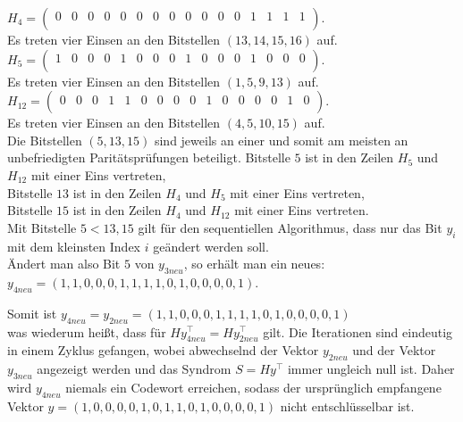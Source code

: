 \begin{Beispiel}
    $H_4= \left( \begin{array}{rrrrrrrrrrrrrrrr}
        0 & 0 & 0 & 0 & 0 & 0 & 0 & 0 & 0 & 0 & 0 & 0 & 1 & 1 & 1 & 1 \\
       \end{array}\right). 
    $\\
    Es treten vier Einsen an den Bitstellen $(13, 14, 15, 16)$ auf.\\
    
    $H_5= \left( \begin{array}{rrrrrrrrrrrrrrrr}
        1 & 0 & 0 & 0 & 1 & 0 & 0 & 0 & 1 & 0 & 0 & 0 & 1 & 0 & 0 & 0 \\
       \end{array}\right). 
    $\\
    Es treten vier Einsen an den Bitstellen $(1, 5, 9, 13)$ auf.\\
    
    $H_{12}= \left( \begin{array}{rrrrrrrrrrrrrrrr}
        0 & 0 & 0 & 1 & 1 & 0 & 0 & 0 & 0 & 1 & 0 & 0 & 0 & 0 & 1 & 0 \\
       \end{array}\right). 
    $\\
    Es treten vier Einsen an den Bitstellen $(4, 5, 10, 15)$ auf.\\
    
    Die Bitstellen $(5, 13, 15)$ sind jeweils an einer und somit am meisten an unbefriedigten Paritätsprüfungen beteiligt.
    Bitstelle $5$ ist in den Zeilen $H_5$ und $H_{12}$ mit einer Eins vertreten,\\
    Bitstelle $13$ ist in den Zeilen $H_4$ und $H_5$ mit einer Eins vertreten,\\
    Bitstelle $15$ ist in den Zeilen $H_4$ und $H_{12}$ mit einer Eins vertreten.\\
    Mit Bitstelle $5 < 13, 15$ gilt für den sequentiellen Algorithmus, dass nur das Bit $y_i$ mit dem kleinsten Index $i$ geändert werden soll.\\
    
    Ändert man also Bit $5$ von $y_{3neu}$, so erhält man ein neues:\\
    $y_{4neu} = (1,1,0,0,0,1,1,1,1,0,1,0,0,0,0,1).$\\
    \pagebreak
    
    Somit ist $y_{4neu} = y_{2neu} = (1,1,0,0,0,1,1,1,1,0,1,0,0,0,0,1)$\\ was wiederum hei\ss{}t, dass für $Hy_{4neu}^\intercal = Hy_{2neu}^\intercal$ gilt. 
    Die Iterationen sind eindeutig in einem Zyklus gefangen, wobei abwechselnd der Vektor $y_{2neu}$ und der Vektor $y_{3neu}$ angezeigt werden und das Syndrom $S=Hy^\intercal$ immer ungleich null ist. 
    Daher wird $y_{4neu}$ niemals ein Codewort erreichen, sodass der ursprünglich empfangene Vektor $y = (1,0,0,0,0,1,0,1,1,0,1,0,0,0,0,1)$ nicht entschlüsselbar ist.\\
    

\end{Beispiel}
